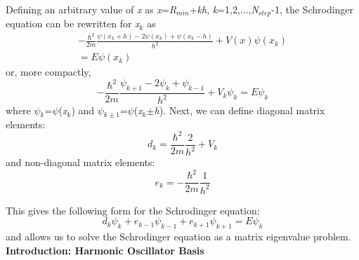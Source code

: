 \documentclass[%
 reprint,
 amsmath,amssymb,
 aps,
]{revtex4-1}
\begin{document}
\noindent Defining an arbitrary value of \textit{x} as \textit{x}=\textit{R}$_{min}$+\textit{kh}, \textit{k}=1,2,...,\textit{N}$_{step}$-1, the Schrodinger equation can be rewritten for \textit{x}$_k$ as
\begin{multline}
-\frac{\hbar^2}{2m}\frac{\psi(x_k+h)-2\psi(x_k)+\psi(x_k-h)}{h^2}+V(x)\psi(x_k)\\
=E\psi(x_k)
\end{multline}
\noindent or, more compactly,
\begin{equation}
-\frac{\hbar^2}{2m}\frac{\psi_{k+1}-2\psi_k+\psi_{k-1}}{h^2}+V_k\psi_k=E\psi_k
\end{equation}
\noindent where \textit{$\psi$}$_k$=\textit{$\psi$}(\textit{x}$_k$) and \textit{$\psi$}$_{k\pm1}$=\textit{$\psi$}(\textit{x}$_k$$\pm$\textit{h}).  Next, we can define diagonal matrix elements:
\begin{equation}
d_k=\frac{\hbar^2}{2m}\frac{2}{h^2}+V_k
\end{equation}
\noindent and non-diagonal matrix elements:
\begin{equation}
e_k=-\frac{\hbar^2}{2m}\frac{1}{h^2}
\end{equation}

\noindent This gives the following form for the Schrodinger equation:
\begin{equation}
d_k\psi_k+e_{k-1}\psi_{k-1}+e_{k+1}\psi_{k+1}=E\psi_k
\end{equation}
\noindent and allows us to solve the Schrodinger equation as a matrix eigenvalue problem.\\

\noindent \textbf{Introduction: Harmonic Oscillator Basis}\\
\end{document}
